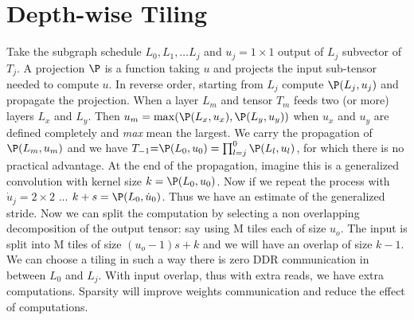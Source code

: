 \documentclass[sigconf]{acmart}
\begin{document}
\section{Depth-wise Tiling}
Take the subgraph schedule $L_0, L_1, \dots L_j$ and $u_j=1\times1$
output of $L_j$ subvector of $T_j$. A projection $\P$ is a function
taking $u$ and projects the input sub-tensor needed to compute $u$.
In reverse order, starting from $L_j$ compute $\P(L_j,u_j)$ and
propagate the projection. When a layer $L_m$ and tensor $T_m$ feeds
two (or more) layers $L_x$ and $L_y$. Then $u_m = \max (
\P(L_x,u_x),\P(L_y,u_y))$ when $u_x$ and $u_y$ are defined completely
and {\em max} mean the largest. We carry the propagation of
$\P(L_m,u_m)$ and we have $T_{-1} \eq \P(L_0, u_0) =\prod_{l=j}^0
\P(L_l, u_l) $, for which there is no practical advantage. At the end
of the propagation, imagine this is a generalized convolution with
kernel size $k = \P(L_0, u_0)$. Now if we repeat the process with
$\dot{u}_j = 2\times 2$ ... $k+s = \P(L_0, \dot{u}_0)$. Thus we have
an estimate of the generalized stride.  Now we can split the
computation by selecting a non overlapping decomposition of the output
tensor: say using M tiles each of size $u_o$. The input is split into
M tiles of size $(u_o-1)s+k$ and we will have an overlap of size
$k-1$. We can choose a tiling in such a way there is zero DDR
communication in between $L_0$ and $L_j$.  With input overlap, thus
with extra reads, we have extra computations. Sparsity will improve
weights communication and reduce the effect of computations. 


\end{document}
